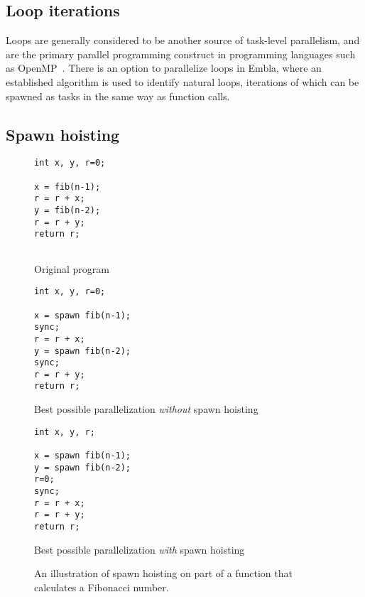 \subsection{Loop iterations}
Loops are generally considered to be another source of task-level parallelism, and are the primary parallel programming construct in programming languages such as OpenMP~\cite{dagum98openmp}.
There is an option to parallelize loops in Embla, where an established algorithm \cite{aho86compilers, muchnick97advanced} is used to identify natural loops, iterations of which can be spawned as tasks in the same way as function calls.

\subsection{Spawn hoisting}

\begin{figure}
  \begin{center}
  \scriptsize
  \begin{subfloat}
    \begin{minipage}{0.7in}
      \begin{verbatim}
int x, y, r=0;

x = fib(n-1);
r = r + x;
y = fib(n-2);
r = r + y;
return r;


      \end{verbatim}
    \end{minipage}%
    \label{orig}
    \caption{Original program}
  \end{subfloat}%
  \qquad
  \begin{subfloat}
    \begin{minipage}{1.0in}
      \begin{verbatim}
int x, y, r=0;

x = spawn fib(n-1);
sync;
r = r + x;
y = spawn fib(n-2);
sync;
r = r + y;
return r;
      \end{verbatim}
    \end{minipage}%
    \label{without}
    \caption{Best possible parallelization \emph{without} spawn hoisting}
  \end{subfloat}%
  \qquad
  \begin{subfloat}
    \begin{minipage}{1.0in}
      \begin{verbatim}
int x, y, r;

x = spawn fib(n-1);
y = spawn fib(n-2);
r=0;
sync;
r = r + x;
r = r + y;
return r;
      \end{verbatim}
    \end{minipage}%
    \label{with}
    \caption{Best possible parallelization \emph{with} spawn hoisting}
  \end{subfloat}%
  \end{center}
  \caption{An illustration of spawn hoisting on part of a function that calculates a Fibonacci number.}
  \label{spawn}
\end{figure}

